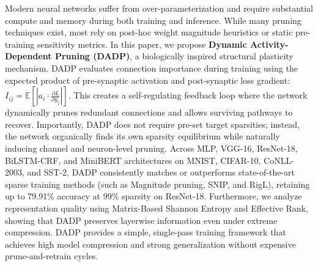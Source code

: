 Modern neural networks suffer from over-parameterization and require substantial compute and memory during both training and inference. While many pruning techniques exist, most rely on post-hoc weight magnitude heuristics or static pre-training sensitivity metrics. In this paper, we propose \textbf{Dynamic Activity-Dependent Pruning (DADP)}, a biologically inspired structural plasticity mechanism. DADP evaluates connection importance during training using the expected product of pre-synaptic activation and post-synaptic loss gradient: $I_{ij} = \mathbb{E}\left[ \left| a_i \cdot \frac{\partial L}{\partial y_j} \right| \right]$. This creates a self-regulating feedback loop where the network dynamically prunes redundant connections and allows surviving pathways to recover. Importantly, DADP does not require pre-set target sparsities; instead, the network organically finds its own sparsity equilibrium while naturally inducing channel and neuron-level pruning. Across MLP, VGG-16, ResNet-18, BiLSTM-CRF, and MiniBERT architectures on MNIST, CIFAR-10, CoNLL-2003, and SST-2, DADP consistently matches or outperforms state-of-the-art sparse training methods (such as Magnitude pruning, SNIP, and RigL), retaining up to 79.91\% accuracy at 99\% sparsity on ResNet-18. Furthermore, we analyze representation quality using Matrix-Based Shannon Entropy and Effective Rank, showing that DADP preserves layerwise information even under extreme compression. DADP provides a simple, single-pass training framework that achieves high model compression and strong generalization without expensive prune-and-retrain cycles.
